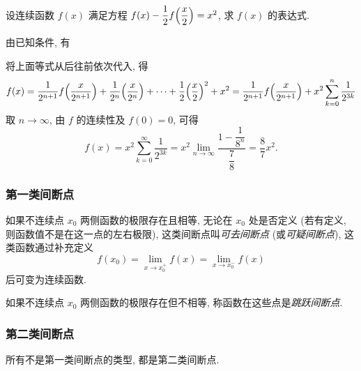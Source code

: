 \begin{example}
    设连续函数 $f(x)$ 满足方程 $f(x)-\dfrac{1}{2}f\qty(\dfrac{x}{2})=x^2$, 求 $f(x)$ 的表达式.
\end{example}
\begin{solution}
    由已知条件, 有 
    将上面等式从后往前依次代入, 得 
    $$
    f(x)=\dfrac{1}{2^{n+1}}f\qty(\dfrac{x}{2^{n+1}})+\dfrac{1}{2^{n}}\qty(\dfrac{x}{2^{n}})+ \cdots +\dfrac{1}{2}\qty(\dfrac{x}{2})^2+x^2=\dfrac{1}{2^{n+1}}f\qty(\dfrac{x}{2^{n+1}})+x^2\sum_{k=0}^{n} \dfrac{1}{2^{3k}}
    $$
    取 $n\to \infty$, 由 $f$ 的连续性及 $f(0)=0$, 可得
    $$
    f(x)=x^2\sum_{k=0}^{\infty} \dfrac{1}{2^{3k}}=x^2\lim_{n\to \infty}\dfrac{1-\dfrac{1}{8^{n}}}{\dfrac{7}{8}}=\dfrac{8}{7}x^2.
    $$
\end{solution}

\subsubsection{第一类间断点}

\begin{definition}[可去间断点]
    如果不连续点 $ x_{0} $ 两侧函数的极限存在且相等, 无论在 $ x_{0} $ 处是否定义
    (若有定义, 则函数值不是在这一点的左右极限),
    这类间断点叫\textit{可去间断点} (或\textit{可疑间断点}), 这类函数通过补充定义
    $$f\left(x_{0}\right)=\lim _{x \to x_{0}^{+}} f(x)=\lim _{x \to x_{0}^{-}} f(x)$$
    后可变为连续函数.
\end{definition}

\begin{definition}[跳跃间断点]
    如果不连续点 $x_{0}$ 两侧函数的极限存在但不相等, 称函数在这些点是\textit{跳跃间断点}.
\end{definition}

\subsubsection{第二类间断点}

所有不是第一类间断点的类型, 都是第二类间断点.


